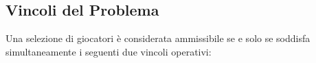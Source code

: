 \documentclass{cisXXX} %
\begin{document}
                                                                                                                                              
    \subsection{Vincoli del Problema}                                                                                                         
                                                                                                                                              
    Una selezione di giocatori è considerata ammissibile se e solo se soddisfa simultaneamente i seguenti due vincoli operativi:              
                                                                                                                                              
\end{document}
